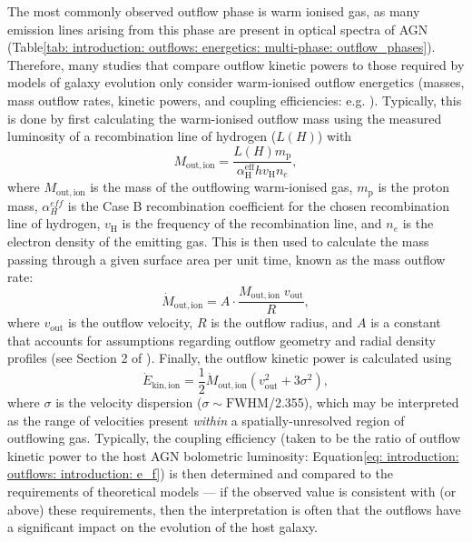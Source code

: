 The most commonly observed outflow phase is warm ionised gas, as many emission lines arising from this phase are present in optical spectra of AGN (Table\;\ref{tab: introduction: outflows: energetics: multi-phase: outflow_phases}). Therefore, many studies that compare outflow kinetic powers to those required by models of galaxy evolution only consider warm-ionised outflow energetics (masses, mass outflow rates, kinetic powers, and coupling efficiencies: e.g. \citealt{Liu2013, Rose2018, Tadhunter2019}). Typically, this is done by first calculating the warm-ionised outflow mass using the measured luminosity of a recombination line of hydrogen ($L(H)$) with
\begin{equation}
    M_\mathrm{out, ion} = \frac{L(H)m_\mathrm{p}}{\alpha^\mathrm{eff}_\mathrm{H}hv_\mathrm{H}n_e},
    \label{eq: introduction: outflows: energetics: mout}
\end{equation}
where $M_\mathrm{out, ion}$ is the mass of the outflowing warm-ionised gas, $m_\mathrm{p}$ is the proton mass, $\alpha^{eff}_{H}$ is the Case B recombination coefficient for the chosen recombination line of hydrogen, $v_\mathrm{H}$ is the frequency of the recombination line, and $n_e$ is the electron density of the emitting gas. This is then used to calculate the mass passing through a given surface area per unit time, known as the mass outflow rate:
\begin{equation}
    \dot{M}_\mathrm{out, ion} = A\cdot\frac{M_\mathrm{out, ion}\;v_\mathrm{out}}{R},
    \label{eq: introduction: outflows: energetics: mout_rate}
\end{equation}
where $v_\mathrm{out}$ is the outflow velocity, $R$ is the outflow radius, and $A$ is a constant that accounts for assumptions regarding outflow geometry and radial density profiles (see Section 2 of \citealt{Veilleux2020}). Finally, the outflow kinetic power is calculated using
\begin{equation}
    \dot{E}_\mathrm{kin, ion} = \frac{1}{2}{\dot{M}_\mathrm{out, ion}(v^2_\mathrm{out} + 3\sigma^2)},
    \label{eq: introduction: outflows: energetics: ekin}
\end{equation}
where $\sigma$ is the velocity dispersion ($\sigma\sim\mathrm{FWHM}$/2.355), which may be interpreted as the range of velocities present \textit{within} a spatially-unresolved region of outflowing gas. Typically, the coupling efficiency (taken to be the ratio of outflow kinetic power to the host AGN bolometric luminosity: Equation\;\ref{eq: introduction: outflows: introduction: e_f}) is then determined and compared to the requirements of theoretical models --- if the observed value is consistent with (or above) these requirements, then the interpretation is often that the outflows have a significant impact on the evolution of the host galaxy.

